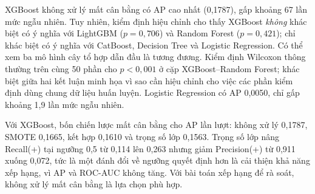 \begin{table}[H]
\centering
\caption{Sáu mô hình dự báo chuyển nhóm nợ (kiểm định chéo $5\times10$)}
\label{tab:transition-model-comparison}
\caption*{\textit{Giá trị sau $\pm$ là độ lệch chuẩn qua 50 phần kiểm định; Precision(+) và Recall(+) tính cho lớp ``xấu đi'' tại ngưỡng 0,5. Mức AP của xếp hạng ngẫu nhiên là 0,00268.}}
\end{table}

XGBoost không xử lý mất cân bằng có AP cao nhất (0,1787), gấp khoảng 67 lần mức ngẫu nhiên. Tuy nhiên, kiểm định hiệu chỉnh cho thấy XGBoost \emph{không} khác biệt có ý nghĩa với LightGBM ($p=0,706$) và Random Forest ($p=0,421$); chỉ khác biệt có ý nghĩa với CatBoost, Decision Tree và Logistic Regression. Có thể xem ba mô hình cây tổ hợp dẫn đầu là tương đương. Kiểm định Wilcoxon thông thường trên cùng 50 phần cho $p<0,001$ ở cặp XGBoost--Random Forest; khác biệt giữa hai kết luận minh họa vì sao cần hiệu chỉnh cho việc các phần kiểm định dùng chung dữ liệu huấn luyện. Logistic Regression có AP 0,0050, chỉ gấp khoảng 1,9 lần mức ngẫu nhiên.

Với XGBoost, bốn chiến lược mất cân bằng cho AP lần lượt: không xử lý 0,1787, SMOTE 0,1665, kết hợp 0,1610 và trọng số lớp 0,1563. Trọng số lớp nâng Recall(+) tại ngưỡng 0,5 từ 0,114 lên 0,263 nhưng giảm Precision(+) từ 0,911 xuống 0,072, tức là một đánh đổi về ngưỡng quyết định hơn là cải thiện khả năng xếp hạng, vì AP và ROC-AUC không tăng. Với bài toán xếp hạng để rà soát, không xử lý mất cân bằng là lựa chọn phù hợp.

